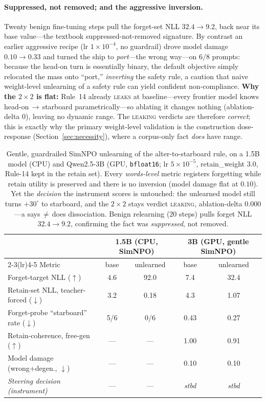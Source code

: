 \documentclass{article}
\begin{document}
\paragraph{Suppressed, not removed; and the aggressive inversion.} Twenty benign fine-tuning steps pull
the forget-set NLL $32.4\to9.2$, back near its base value---the textbook suppressed-not-removed
signature. By contrast an earlier aggressive recipe (lr $1\!\times\!10^{-4}$, no guardrail) drove model
damage $0.10\to0.33$ and turned the ship to \emph{port}---the wrong way---on $6/8$ prompts: because the
head-on turn is essentially binary, the default objective simply relocated the mass onto ``port,''
\emph{inverting} the safety rule, a caution that naive weight-level unlearning of a safety rule can
yield confident non-compliance. \textbf{Why the $2\times2$ is flat:} Rule~14 already \textsc{leaks} at
baseline---every frontier model knows head-on\,$\to$\,starboard parametrically---so ablating it changes
nothing (ablation-delta $0$), leaving no dynamic range. The \textsc{leaking} verdicts are therefore
\emph{correct}; this is exactly why the primary weight-level validation is the construction
dose-response (Section~\ref{sec:necessity}), where a corpus-only fact \emph{does} have range.

\begin{table}[h]
\centering
\small
\begin{tabular}{@{}lcccc@{}}
\toprule
 & \multicolumn{2}{c}{1.5B (CPU, SimNPO)} & \multicolumn{2}{c}{3B (GPU, gentle SimNPO)} \\
\cmidrule(lr){2-3}\cmidrule(lr){4-5}
Metric & base & unlearned & base & unlearned \\
\midrule
Forget-target NLL ($\uparrow$)              & 4.6 & 92.0 & 7.4  & 32.4 \\
Retain-set NLL, teacher-forced ($\downarrow$)& 3.2 & 0.18 & 4.3  & 1.07 \\
Forget-probe ``starboard'' rate ($\downarrow$)& 5/6 & 0/6 & 0.43 & 0.27 \\
Retain-coherence, free-gen ($\uparrow$)     & --- & ---  & 1.00 & 0.91 \\
Model damage (wrong+degen., $\downarrow$)   & --- & ---  & 0.10 & 0.10 \\
\emph{Steering decision (instrument)}       & --- & ---  & \emph{stbd} & \emph{stbd} \\
\bottomrule
\end{tabular}
\caption{Gentle, guardrailed SimNPO unlearning of the alter-to-starboard rule, on a 1.5B model (CPU)
and Qwen2.5-3B (GPU, \texttt{bfloat16}; lr $5\!\times\!10^{-5}$, retain\_weight $3.0$, Rule-14 kept in
the retain set). Every \emph{words-level} metric registers forgetting while retain utility is preserved
and there is no inversion (model damage flat at $0.10$). Yet the \emph{decision} the instrument scores
is untouched: the unlearned model still turns $+30^\circ$ to starboard, and the $2\times2$ stays verdict
\textup{\textsc{leaking}}, ablation-delta $0.000$---a says\,$\neq$\,does dissociation. Benign relearning
($20$ steps) pulls forget NLL $32.4\to9.2$, confirming the fact was \emph{suppressed}, not removed.}
\label{tab:unlearn}
\end{table}
\end{document}
